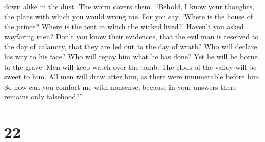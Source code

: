 down alike in the dust. The worm covers them.  ``Behold,
I know your thoughts, the plans with which you would wrong me.
 For you say, `Where is the house of the prince? Where is
the tent in which the wicked lived?'  Haven't you asked
wayfaring men? Don't you know their evidences,  that the
evil man is reserved to the day of calamity, that they are led out to
the day of wrath?  Who will declare his way to his face?
Who will repay him what he has done?  Yet he will be
borne to the grave. Men will keep watch over the tomb. 
The clods of the valley will be sweet to him. All men will draw after
him, as there were innumerable before him.  So how can
you comfort me with nonsense, because in your answers there remains only
falsehood?''

\hypertarget{section-21}{%
\section{22}\label{section-21}}

